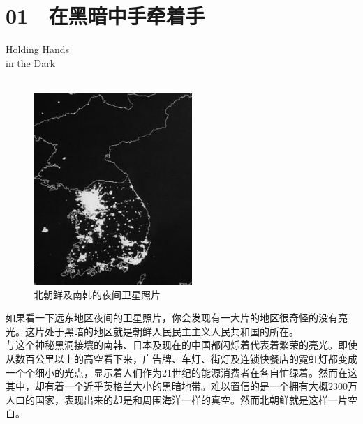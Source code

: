 \fancyhead[RO]{{\tiny{\textcolor{Gray}{\FA \ }}}\thepage}
\fancyhead[LE]{{\tiny{\textcolor{Gray}{\FA \ }}}\thepage}
\fancyfoot[LE,RO]{}
\fancyfoot[LO,CE]{}
\fancyfoot[CO,RE]{}
\chapter*{01 {\FA } 在黑暗中手牵着手}
\begin{flushright}
	\textcolor{PinYinColor}{\EN \huge{Holding Hands\\
		in the Dark\\
	\ \\}}
\end{flushright}
\begin{figure}[!htbp]
	\centering
	\includegraphics[width=6cm]{./Chapters/Images/01.jpg}
	\caption*{北朝鲜及南韩的夜间卫星照片}
\end{figure}

如果看一下远东地区夜间的卫星照片，你会发现有一大片的地区很奇怪的没有亮光。这片处于黑暗的地区就是朝鲜人民民主主义人民共和国的所在。\\

与这个神秘黑洞接壤的南韩、日本及现在的中国都闪烁着代表着繁荣的亮光。即使从数百公里以上的高空看下来，广告牌、车灯、街灯及连锁快餐店的霓虹灯都变成一个个细小的光点，显示着人们作为21世纪的能源消费者在各自忙绿着。然而在这其中，却有着一个近乎英格兰大小的黑暗地带。难以置信的是一个拥有大概2300万人口的国家，表现出来的却是和周围海洋一样的真空。然而北朝鲜就是这样一片空白。\\

